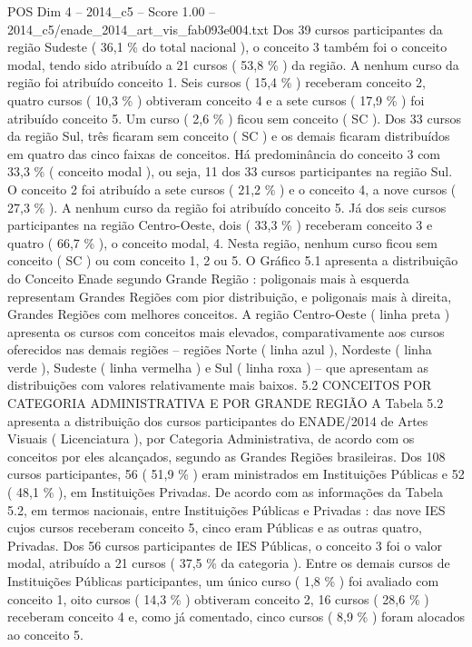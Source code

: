 \begin{textsample}{POS Dim 4 – 2014\_c5 – Score 1.00 – 2014\_c5/enade\_2014\_art\_vis\_fab093e004.txt}
Dos 39 cursos participantes da região Sudeste ( 36,1 \% do total nacional ), o conceito 3 também foi o conceito modal, tendo sido atribuído a 21 cursos ( 53,8 \% ) da região.
A nenhum curso da região foi atribuído conceito 1.
Seis cursos ( 15,4 \% ) receberam conceito 2, quatro cursos ( 10,3 \% ) obtiveram conceito 4 e a sete cursos ( 17,9 \% ) foi atribuído conceito 5.
Um curso ( 2,6 \% ) ficou sem conceito ( SC ).
Dos 33 cursos da região Sul, três ficaram sem conceito ( SC ) e os demais ficaram distribuídos em quatro das cinco faixas de conceitos.
Há predominância do conceito 3 com 33,3 \% ( conceito modal ), ou seja, 11 dos 33 cursos participantes na região Sul.
O conceito 2 foi atribuído a sete cursos ( 21,2 \% ) e o conceito 4, a nove cursos ( 27,3 \% ).
A nenhum curso da região foi atribuído conceito 5.
Já dos seis cursos participantes na região Centro-Oeste, dois ( 33,3 \% ) receberam conceito 3 e quatro ( 66,7 \% ), o conceito modal, 4.
Nesta região, nenhum curso ficou sem conceito ( SC ) ou com conceito 1, 2 ou 5.
O Gráfico 5.1 apresenta a distribuição do Conceito Enade segundo Grande Região : poligonais mais à esquerda representam Grandes Regiões com pior distribuição, e poligonais mais à direita, Grandes Regiões com melhores conceitos.
A região Centro-Oeste ( linha preta ) apresenta os cursos com conceitos mais elevados, comparativamente aos cursos oferecidos nas demais regiões – regiões Norte ( linha azul ), Nordeste ( linha verde ), Sudeste ( linha vermelha ) e Sul ( linha roxa ) – que apresentam as distribuições com valores relativamente mais baixos. 5.2 CONCEITOS POR CATEGORIA ADMINISTRATIVA E POR GRANDE REGIÃO A Tabela 5.2 apresenta a distribuição dos cursos participantes do ENADE/2014 de Artes Visuais ( Licenciatura ), por Categoria Administrativa, de acordo com os conceitos por eles alcançados, segundo as Grandes Regiões brasileiras.
Dos 108 cursos participantes, 56 ( 51,9 \% ) eram ministrados em Instituições Públicas e 52 ( 48,1 \% ), em Instituições Privadas.
De acordo com as informações da Tabela 5.2, em termos nacionais, entre Instituições Públicas e Privadas : das nove IES cujos cursos receberam conceito 5, cinco eram Públicas e as outras quatro, Privadas.
Dos 56 cursos participantes de IES Públicas, o conceito 3 foi o valor modal, atribuído a 21 cursos ( 37,5 \% da categoria ).
Entre os demais cursos de Instituições Públicas participantes, um único curso ( 1,8 \% ) foi avaliado com conceito 1, oito cursos ( 14,3 \% ) obtiveram conceito 2, 16 cursos ( 28,6 \% ) receberam conceito 4 e, como já comentado, cinco cursos ( 8,9 \% ) foram alocados ao conceito 5.

\end{textsample}

